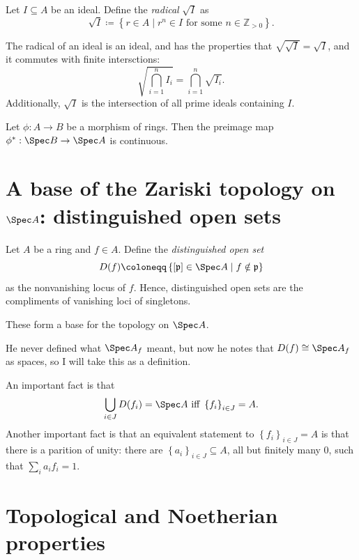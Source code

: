 \begin{definition}\label{dfn:3-4-2}
	Let $I\subseteq A$ be an ideal. Define the \emph{radical} $\sqrt{I} $ as
	\[
		\sqrt{I} \coloneqq \left\{ r\in A\mid r^n\in I\text{ for some } n\in\mathbb{Z} _{>0}  \right\} 
	.\]
\end{definition}

The radical of an ideal is an ideal, and has the properties that $\sqrt{\sqrt{I} } =\sqrt{I} $, and it commutes with finite intersctions:
\[
	\sqrt{\bigcap_{i=1} ^n I_i} =\bigcap_{i=1} ^n \sqrt{I_i} 
.\]
Additionally, $\sqrt{I} $ is the intersection of all prime ideals containing $I$.

Let $\phi : A \to B$ be a morphism of rings. Then the preimage map $\phi^* : \Spec B \to \Spec A$ is continuous.


\section{A base of the Zariski topology on $\Spec A$: distinguished open sets}

\begin{definition}\label{dfn:3-6-1}
	Let $A$ be a ring and $f\in A$. Define the \emph{distinguished open set}
	\[
		D(f) \coloneqq \left\{ [\mathfrak{p} ]\in \Spec A \mid f\notin \mathfrak{p}  \right\} 
	\]
	as the nonvanishing locus of $f$. Hence, distinguished open sets are the compliments of vanishing loci of singletons.
\end{definition}

These form a base for the topology on $\Spec A$.

\begin{remark}
	He never defined what $\Spec A_f$ meant, but now he notes that $D(f) \cong \Spec A_f$ as spaces, so I will take this as a definition.
\end{remark}

An important fact is that
\[
	\bigcup_{i\in J}D(f_i) =\Spec A \text{ iff } \left\{ f_i \right\} _{i\in J} =A
.\]
Another important fact is that an equivalent statement to $\left\{ f_i \right\} _{i\in J} =A$ is that there is a parition of unity: there are $\left\{ a_i \right\} _{i\in J} \subseteq A$, all but finitely many 0, such that $\sum_{i} a_if_i=1$.

\section{Topological and Noetherian properties}

